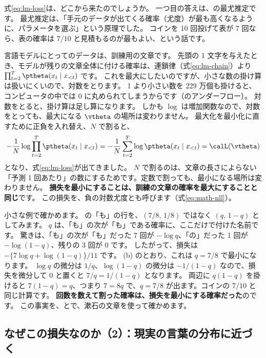 式\eqref{eq:lm-loss}は、どこから来たのでしょうか。
一つ目の答えは、の最尤推定です。
最尤推定は、「手元のデータが出てくる確率（尤度）が最も高くなるように、パラメータを選ぶ」という原理でした。
コインを 10 回投げて表が 7 回なら、表の確率は $7/10$ と見積もるのが最もよい、という話です。

言語モデルにとってのデータは、訓練用の文章です。
先頭の 1 文字を与えたとき、モデルが残りの文章全体に付ける確率は、連鎖律（式\eqref{eq:lm-chain}）より $\prod_{t=2}^{T}\ptheta(x_t\mid x_{<t})$ です。
これを最大にしたいのですが、小さな数の掛け算は扱いにくいので、対数をとります。
1 より小さい数を 229 万個も掛けると、コンピュータの中では 0 に丸められてしまうからです（のアンダーフロー）。
対数をとると、掛け算は足し算になります。
しかも $\log$ は増加関数なので、対数をとっても、最大になる $\vtheta$ の場所は変わりません。
最大化を最小化に直すために正負を入れ替え、$N$ で割ると、
\begin{equation*}
-\frac{1}{N}\log\prod_{t=2}^{T}\ptheta(x_t\mid x_{<t})=-\frac{1}{N}\sum_{t=2}^{T}\log\ptheta(x_t\mid x_{<t})=\calL(\vtheta)
\end{equation*}
となり、式\eqref{eq:lm-loss}が出てきました。
$N$ で割るのは、文章の長さによらない「予測 1 回あたり」の数にするためです。定数で割っても、最小になる場所は変わりません。
\textbf{損失を最小にすることは、訓練の文章の確率を最大にすることと同じ}です。
この損失を、負の対数尤度とも呼びます（式\eqref{eq:math-nll}）。

小さな例で確かめます。
の「も」の行を、$(7/8,\,1/8)$ ではなく $(q,\,1-q)$ としてみます。
$q$ は、「も」の次が「も」である確率に、ここだけで付けた名前です。
驚きは、「も」の次が「も」だった 7 回が $-\log q$、「の」だった 1 回が $-\log(1-q)$、残りの 3 回が 0 です。
したがって、損失は $-\{7\log q+\log(1-q)\}/11$ です。
(b) のとおり、これは $q=7/8$ で最小になります。
$\log q$ の微分は $1/q$、$\log(1-q)$ の微分は $-1/(1-q)$ なので、損失を微分して 0 と置くと $7/q=1/(1-q)$ となります。
両辺に $q(1-q)$ を掛けると $7(1-q)=q$、つまり $7=8q$ で、$q=7/8$ が出ます。コインの $7/10$ と同じ計算です。
\textbf{回数を数えて割った確率は、損失を最小にする確率だった}のです。
この事実を、とで、漱石の文章を使って確かめます。

\subsection*{なぜこの損失なのか（2）：現実の言葉の分布に近づく}

